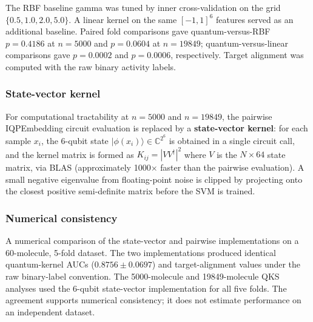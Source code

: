 \documentclass[11pt,a4paper]{article}
\begin{document}
The RBF baseline gamma was tuned by inner cross-validation on the grid $\{0.5, 1.0, 2.0, 5.0\}$. A linear kernel on the same $[-1,1]^6$ features served as an additional baseline. Paired fold comparisons gave quantum-versus-RBF $p=0.4186$ at $n=5000$ and $p=0.0604$ at $n=19849$; quantum-versus-linear comparisons gave $p=0.0002$ and $p=0.0006$, respectively. Target alignment was computed with the raw binary activity labels.

\subsubsection{State-vector kernel}
For computational tractability at $n=\num{5000}$ and $n=\num{19849}$, the pairwise IQPEmbedding circuit evaluation is replaced by a \textbf{state-vector kernel}: for each sample $x_i$, the 6-qubit state $|\phi(x_i)\rangle \in \mathbb{C}^{2^6}$ is obtained in a single circuit call, and the kernel matrix is formed as $K_{ij} = |V V^\dagger|^2$ where $V$ is the $N \times 64$ state matrix, via BLAS (approximately \num{1000}$\times$ faster than the pairwise evaluation). A small negative eigenvalue from floating-point noise is clipped by projecting onto the closest positive semi-definite matrix before the SVM is trained.

\subsubsection{Numerical consistency}
A numerical comparison of the state-vector and pairwise implementations on a 60-molecule, 5-fold dataset. The two implementations produced identical quantum-kernel AUCs ($\num{0.8756}\pm\num{0.0697}$) and target-alignment values under the raw binary-label convention. The \num{5000}-molecule and \num{19849}-molecule QKS analyses used the 6-qubit state-vector implementation for all five folds. The agreement supports numerical consistency; it does not estimate performance on an independent dataset.
\end{document}
